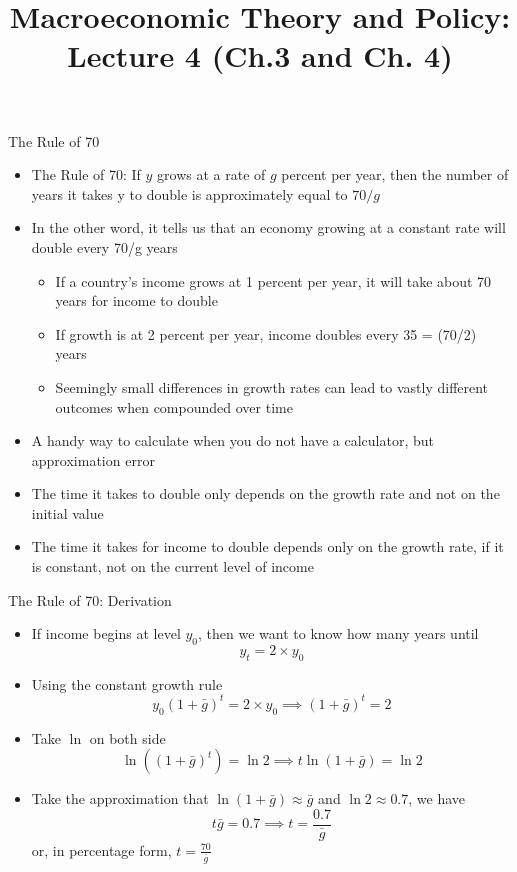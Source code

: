 \documentclass[aspectratio=1610]{beamer}
\title[Fall - Lecture 4] %
{Macroeconomic Theory and Policy: Lecture  4 (Ch.3 and Ch. 4)}
\author[University of Toronto] %
{}
\date[] %
\begin{document}
\begin{frame}
  \titlepage
\end{frame}


\begin{frame}[wide]{The Rule of 70}
	\begin{itemize}
		\item The Rule of 70: If $y$ grows at a rate of $g$ percent per year, then the number of years it takes y to double is approximately equal to $70/g$
		\item In the other word, it tells us that an economy growing at a constant rate will double every 70/g years
		\begin{itemize}
			\item If a country’s income grows at 1 percent per year, it will take about 70 years for income to double
			\item If growth is at 2 percent per year,	income doubles every 35 = (70/2) years
			\item Seemingly small differences in growth rates can lead to vastly different outcomes when compounded over time
		\end{itemize}
		\item A handy way to calculate when you do not have a calculator, but approximation error
		\item The time it takes to double only depends on the growth rate and not on the initial value
		\item The time it takes for income to double depends only on the growth rate, if it is constant, not on the current level of income
		
	\end{itemize}
\end{frame}

\begin{frame}[wide]{The Rule of 70: Derivation}
	\begin{itemize}
		\item If income begins at level $y_0$, then we want to know how many years until
		\[y_t=2\times y_0\]
		\item Using the constant growth rule
		\[y_0(1+\bar{g})^t =2\times y_0 \implies (1+\bar{g})^t =2  \]
		\item Take $\ln$ on both side
		\[ \ln\left((1+\bar{g})^t\right) =\ln2 \implies t\ln\left(1+\bar{g}\right) =\ln2\]
		\item Take the approximation that $\ln\left(1+\bar{g}\right) \approx \bar{g}$ and $\ln2 \approx 0.7$, we have
		\[t\bar{g} = 0.7 \implies t = \frac{0.7}{\bar{g}}\]
		or, in percentage form,
		$t = \frac{70}{\bar{g}}$
	\end{itemize}
\end{frame}
\end{document}
